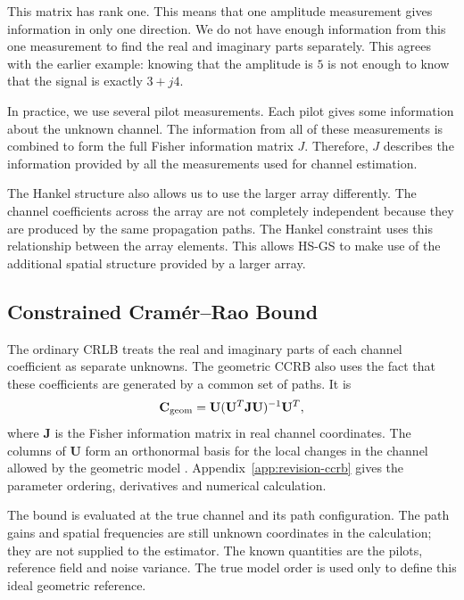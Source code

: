 \documentclass[journal]{IEEEtran}
\begin{document}
This matrix has rank one. This means that one amplitude measurement gives
information in only one direction. We do not have enough information from
this one measurement to find the real and imaginary parts separately. This
agrees with the earlier example: knowing that the amplitude is $5$ is not
enough to know that the signal is exactly $3+j4$.

In practice, we use several pilot measurements. Each pilot gives some
information about the unknown channel. The information from all of these
measurements is combined to form the full Fisher information matrix $J$.
Therefore, $J$ describes the information provided by all the measurements
used for channel estimation.

The Hankel structure also allows us to use the larger array differently.
The channel coefficients across the array are not completely independent
because they are produced by the same propagation paths. The Hankel
constraint uses this relationship between the array elements. This allows
HS-GS to make use of the additional spatial structure provided by a larger
array.

\subsection{Constrained Cram\'er--Rao Bound}
\label{sec:revised-ccrb}

The ordinary CRLB treats the real and imaginary parts of each channel
coefficient as separate unknowns. The geometric CCRB also uses the fact
that these coefficients are generated by a common set of paths. It is
\begin{equation}
\mathbf C_{\rm geom}
=\mathbf U(\mathbf U^T\mathbf J\mathbf U)^{-1}\mathbf U^T,
\label{eq:revision-ccrb}
\end{equation}
where $\mathbf J$ is the Fisher information matrix in real channel
coordinates. The columns of $\mathbf U$ form an orthonormal basis for the
local changes in the channel allowed by the geometric model
\cite{gorman1990,stoica1998}. Appendix~\ref{app:revision-ccrb} gives the
parameter ordering, derivatives and numerical calculation.

The bound is evaluated at the true channel and its path configuration.
The path gains and spatial frequencies are still unknown coordinates in
the calculation; they are not supplied to the estimator. The known
quantities are the pilots, reference field and noise variance. The true
model order is used only to define this ideal geometric reference.
\end{document}
